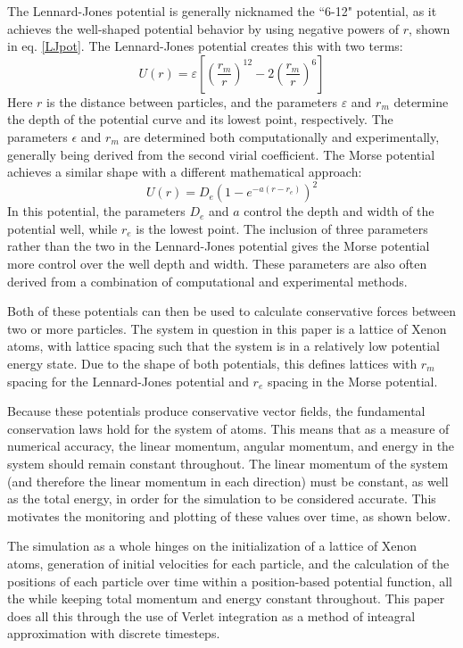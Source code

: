\documentclass[12pt]{article}
\begin{document}
The Lennard-Jones potential is generally nicknamed the ``6-12" potential, as it achieves the well-shaped potential behavior by using negative powers of $r$, shown in eq. \ref{LJpot}. The Lennard-Jones potential creates this with two terms:
\begin{equation}
\label{LJpot}
U(r) = \varepsilon\left[ \left( \frac{r_m}{r} \right)^{12}-2\left(\frac{r_m}{r}\right)^6\right]
\end{equation}
Here $r$ is the distance between particles, and the parameters $\varepsilon$ and $r_m$ determine the depth of the potential curve and its lowest point, respectively. \cite{ljpotential} The parameters $\epsilon$ and $r_m$ are determined both computationally and experimentally, generally being derived from the second virial coefficient. \cite{ljconstants} The Morse potential achieves a similar shape with a different mathematical approach:
\begin{equation}
\label{morsepot}
U(r) = D_e \left(1-e^{-a(r-r_e)}\right)^2
\end{equation}
In this potential, the parameters $D_e$ and $a$ control the depth and width of the potential well, while $r_e$ is the lowest point. \cite{mpotential}  The inclusion of three parameters rather than the two in the Lennard-Jones potential gives the Morse potential more control over the well depth and width.  These parameters are also often derived from a combination of computational and experimental methods. \cite{mconstants}

Both of these potentials can then be used to calculate conservative forces between two or more particles.  The system in question in this paper is a lattice of Xenon atoms, with lattice spacing such that the system is in a relatively low potential energy state.  Due to the shape of both potentials, this defines lattices with $r_m$ spacing for the Lennard-Jones potential and $r_e$ spacing in the Morse potential.

Because these potentials produce conservative vector fields, the fundamental conservation laws hold for the system of atoms.  This means that as a measure of numerical accuracy, the linear momentum, angular momentum, and energy in the system should remain constant throughout.  The linear momentum of the system (and therefore the linear momentum in each direction) must be constant, as well as the total energy, in order for the simulation to be considered accurate.  This motivates the monitoring and plotting of these values over time, as shown below.

The simulation as a whole hinges on the initialization of a lattice of Xenon atoms, generation of initial velocities for each particle, and the calculation of the positions of each particle over time within a position-based potential function, all the while keeping total momentum and energy constant throughout.  This paper does all this through the use of Verlet integration as a method of inteagral approximation with discrete timesteps.
\end{document}
